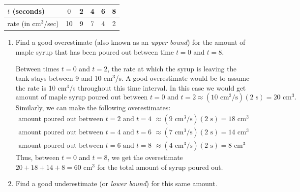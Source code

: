 \documentclass{article}
\begin{document}
\begin{enumerate}
  \begin{tabular}{l|c|c|c|c|c}
    $t$ (seconds)& $0$& 2& 4& 6& 8\\
    \hline
    rate (in cm$^3$/sec)& 10& 9& 7& 4& 2
  \end{tabular}

  \begin{enumerate}

  \item
\begin{problem}[\vfill]
      Find a good overestimate (also known as an \emph{upper bound}) for
      the amount of maple syrup that has been poured out between time $t =
      0$ and $t = 8$.
    \end{problem}

    \begin{solution} %
      Between times $t = 0$ and $t = 2$, the rate at which the syrup is
      leaving the tank stays between 9 and 10 cm$^3$/s.  A good
      overestimate would be to assume the rate is 10 cm$^3$/s throughout
      this time interval. In this case we would get
      \[ \text{amount of maple syrup poured out between $t = 0$ and $t =
        2$} \approx (10 \text{ cm$^3$/s})(2 \text{ s}) = 20 \text{ cm}^3.\]
      Similarly, we can make the following overestimates:
      \begin{align*}
        \text{amount poured out between $t = 2$ and $t = 4$} & \approx (9
        \text{ cm$^3$/s})(2 \text{ s}) = 18 \text{ cm}^3 \\
        \text{amount poured out between $t = 4$ and $t = 6$} & \approx (7
        \text{ cm$^3$/s})(2 \text{ s}) = 14 \text{ cm}^3 \\
        \text{amount poured out between $t = 6$ and $t = 8$} & \approx (4
        \text{ cm$^3$/s})(2 \text{ s}) = 8 \text{ cm}^3 
      \end{align*}
      Thus, between $t = 0$ and $t = 8$, we get the overestimate $20 + 18
      + 14 + 8 = \boxed{60 \text{ cm}^3}$ for the total amount of syrup
      poured out.
    \end{solution}

  \item
    \begin{problem}[\vfill]
      Find a good underestimate (or \emph{lower bound}) for this same
      amount.
    \end{problem}


\end{enumerate}
\end{enumerate}
\end{document}
